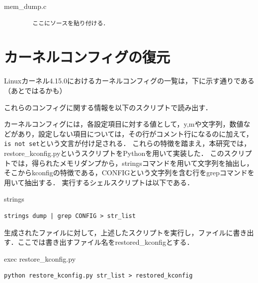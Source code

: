 \begin{itembox}[l]{mem_dump.c}
    \begin{verbatim}
        ここにソースを貼り付ける．
    \end{verbatim}
\end{itembox}

\section{カーネルコンフィグの復元}
\label{section:restore_kconfig}

Linuxカーネル4.15.0におけるカーネルコンフィグの一覧は，下に示す通りである（あとではるかも）

これらのコンフィグに関する情報を以下のスクリプトで読み出す．

カーネルコンフィグには，各設定項目に対する値として，y,mや文字列，数値などがあり，設定しない項目については，その行がコメント行になるのに加えて，\verb|is not set|という文言が付け足される．
これらの特徴を踏まえ，本研究では，restore_kconfig.pyというスクリプトをPythonを用いて実装した．
このスクリプトでは，得られたメモリダンプから，stringsコマンドを用いて文字列を抽出し，そこからkconfigの特徴である，CONFIGという文字列を含む行をgrepコマンドを用いて抽出する．
実行するシェルスクリプトは以下である．

\begin{itembox}[l]{strings}
    \begin{verbatim}
strings dump | grep CONFIG > str_list
    \end{verbatim}
\end{itembox}

生成されたファイルに対して，上述したスクリプトを実行し，ファイルに書き出す．ここでは書き出すファイル名をrestored_kconfigとする．

\begin{itembox}[l]{exec restore_kconfig.py}
    \begin{verbatim}
python restore_kconfig.py str_list > restored_kconfig
    \end{verbatim}
\end{itembox}

